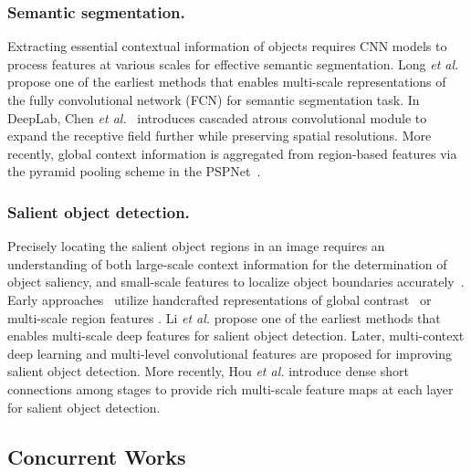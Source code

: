 \documentclass[10pt,journal,cspaper,compsoc]{IEEEtran}
\newcommand{\myPara}[1]{\subsubsection{#1}}
\def\etal{{\em et al.}}
\def\etal{{\em et al.}}
\begin{document}
\myPara{Semantic segmentation.}

Extracting essential contextual information of objects requires CNN models
to process features at various scales for effective semantic segmentation.
Long \etal~\cite{long2015fully} propose one of the earliest methods that
enables multi-scale representations of the fully convolutional network (FCN)
for semantic segmentation task.
In DeepLab,
Chen \etal~\cite{chen2018deeplab,chen2017rethinking}
introduces cascaded atrous convolutional module to
expand the receptive field further while preserving spatial resolutions.
More recently, global context information is aggregated from
region-based features via the pyramid pooling scheme in the
PSPNet~\cite{Zhao2017PSP}.



\myPara{Salient object detection.}

Precisely locating the salient object regions in an image
requires an understanding of both large-scale context information
for the determination of object saliency, 
and small-scale features to localize object boundaries accurately~\cite{zhao2019optimizing}.
Early approaches~\cite{borji2015salient} utilize handcrafted
representations of global contrast~\cite{cheng2015global} or
multi-scale region features \cite{WangDRFI2017}.
Li \etal \cite{li2015visual} propose one of the earliest methods that
enables multi-scale deep features for salient object detection.
Later, multi-context deep learning \cite{zhao2015saliency}
and multi-level convolutional features \cite{zhang2017amulet}
are proposed for improving salient object detection.
More recently, Hou \etal \cite{hou2017deeply} introduce dense
short connections among stages to provide rich multi-scale
feature maps at each layer for salient object detection.

\subsection{Concurrent Works} \label{sec:Concurrent_works}
\end{document}
